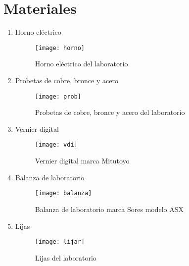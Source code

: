 \documentclass[a4paper,12pt]{report}
\begin{document}
\chapter{Materiales}
\begin{enumerate}
\item Horno eléctrico
\begin{figure}[H]
\begin{center}
\texttt{[image: horno]}
\caption{Horno eléctrico del laboratorio}
\end{center}
\end{figure}
\newpage
\item Probetas de cobre, bronce y acero
\begin{figure}[H]
\begin{center}
\texttt{[image: prob]}
\caption{Probetas de cobre, bronce y acero del laboratorio}
\end{center}
\end{figure}
\item Vernier digital
\begin{figure}[H]
\begin{center}
\texttt{[image: vdi]}
\caption{Vernier digital marca Mitutoyo}
\end{center}
\end{figure}
\item Balanza de laboratorio
\begin{figure}[H]
\begin{center}
\texttt{[image: balanza]}
\caption{Balanza de laboratorio marca Sores modelo ASX}
\end{center}
\end{figure}
\item Lijas
\begin{figure}[H]
\begin{center}
\texttt{[image: lijar]}
\caption{Lijas del laboratorio}
\end{center}
\end{figure}
\end{enumerate}
\end{document}
